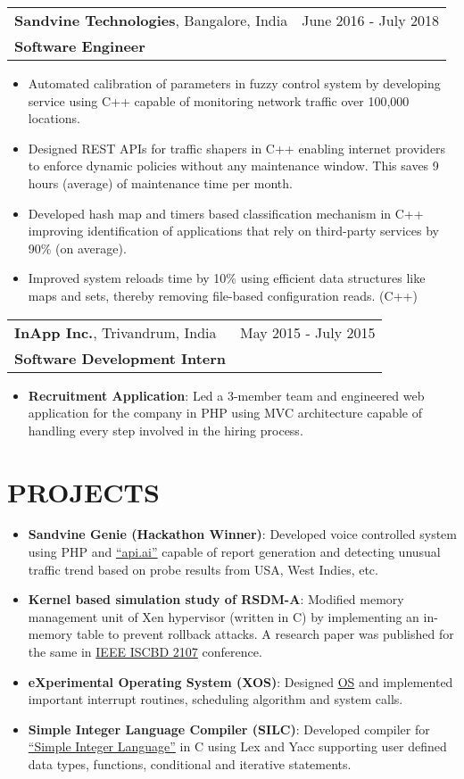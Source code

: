 \documentclass[11pt]{article}
\makeatletter
\newcommand{\resumeItem}[2]{
  \item{
    \textbf{#1}{: #2 \vspace{-2pt}}
  }
}
\newcommand{\resumeExpHeading}[5]{
    \vspace{-1pt}
    \begin{tabular*}{\textwidth}{l@{\extracolsep{\fill}}r}
      \textbf{\large#1}{#2} & #5 \\
      \textbf{#3}\text{#4} &  \\
    \end{tabular*}
}
\newcommand{\resumeSubItem}[2]{\resumeItem{#1}{#2}\vspace{-4pt}}
\newcommand{\resumeSubHeadingListStart}{\begin{itemize}[leftmargin=*]}
\newcommand{\resumeSubHeadingListEnd}{\end{itemize}}
\newcommand{\normalListItem}[1]{\item{#1}\vspace{-6pt}}
\makeatother
\begin{document}
    \resumeExpHeading
      {Sandvine Technologies}{, Bangalore, India}
      {Software Engineer} {}{June 2016 - July 2018}
      \resumeSubHeadingListStart
        \normalListItem
        {Automated calibration of parameters in fuzzy control system by developing service using C++ capable of monitoring network traffic over 100,000 locations.}  
        \normalListItem
          {Designed REST APIs for traffic shapers in C++ enabling internet providers to enforce dynamic policies without any maintenance window. This saves 9 hours (average) of maintenance time per month.}  
        \normalListItem
          {Developed hash map and timers based classification mechanism in C++ improving identification of applications that rely on third-party services by 90\% (on average).}
        \normalListItem
          {Improved system reloads time by 10\% using efficient data structures like maps and sets, thereby removing file-based configuration reads. (C++)}
      \resumeSubHeadingListEnd
\vspace{7pt}
    \resumeExpHeading
      {InApp Inc.}{, Trivandrum, India}
      {Software Development Intern} {}{May 2015 - July 2015}
      \resumeSubHeadingListStart
        \resumeSubItem{Recruitment Application}
          {Led a 3-member team and engineered web application for the company in PHP using MVC architecture capable of handling every step involved in the hiring process.}
      \resumeSubHeadingListEnd
  
\section{PROJECTS}
  \resumeSubHeadingListStart
    \resumeSubItem{Sandvine Genie (Hackathon Winner)}
          {Developed voice controlled system using PHP and \href{https://dialogflow.com/}{``api.ai''} capable of report generation and detecting unusual traffic trend based on probe results from USA, West Indies, etc.}
    \resumeSubItem{Kernel based simulation study of RSDM-A}
      {Modified memory management unit of Xen hypervisor (written in C) by implementing an in-memory table to prevent rollback attacks. A research paper was published for the same in \href{https://ieeexplore.ieee.org/document/8181523/}{IEEE ISCBD 2107} conference.}
    \resumeSubItem{eXperimental Operating System (XOS)}
      {Designed \href{http://xosnitc.github.io/}{OS} and implemented important interrupt routines, scheduling algorithm and system calls.}
    \resumeSubItem{Simple Integer Language Compiler (SILC)}
          {Developed compiler for \href{http://silcnitc.github.io/}{``Simple Integer Language''} in C using Lex and Yacc supporting user defined data types, functions, conditional and iterative statements.}
    \resumeSubHeadingListEnd
\end{document}
